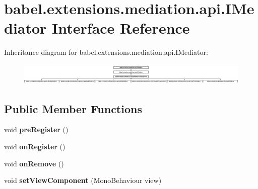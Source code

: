 \hypertarget{interfacebabel_1_1extensions_1_1mediation_1_1api_1_1_i_mediator}{\section{babel.\-extensions.\-mediation.\-api.\-I\-Mediator Interface Reference}
\label{interfacebabel_1_1extensions_1_1mediation_1_1api_1_1_i_mediator}
}
Inheritance diagram for babel.\-extensions.\-mediation.\-api.\-I\-Mediator\-:\begin{figure}[H]
\begin{center}
\leavevmode
\includegraphics[height=1.051643cm]{interfacebabel_1_1extensions_1_1mediation_1_1api_1_1_i_mediator}
\end{center}
\end{figure}
\subsection*{Public Member Functions}
\begin{DoxyCompactItemize}
\item 
\hypertarget{interfacebabel_1_1extensions_1_1mediation_1_1api_1_1_i_mediator_a7378512f73676b440c38921fb16c12e1}{void {\bfseries pre\-Register} ()}\label{interfacebabel_1_1extensions_1_1mediation_1_1api_1_1_i_mediator_a7378512f73676b440c38921fb16c12e1}

\item 
\hypertarget{interfacebabel_1_1extensions_1_1mediation_1_1api_1_1_i_mediator_aa621d634cb11563a449b0196c7b78317}{void {\bfseries on\-Register} ()}\label{interfacebabel_1_1extensions_1_1mediation_1_1api_1_1_i_mediator_aa621d634cb11563a449b0196c7b78317}

\item 
\hypertarget{interfacebabel_1_1extensions_1_1mediation_1_1api_1_1_i_mediator_abca25600d76d3797cb6ec2bacdc001eb}{void {\bfseries on\-Remove} ()}\label{interfacebabel_1_1extensions_1_1mediation_1_1api_1_1_i_mediator_abca25600d76d3797cb6ec2bacdc001eb}

\item 
\hypertarget{interfacebabel_1_1extensions_1_1mediation_1_1api_1_1_i_mediator_a806a9d50f2c849357afda6e3a65856a4}{void {\bfseries set\-View\-Component} (Mono\-Behaviour view)}\label{interfacebabel_1_1extensions_1_1mediation_1_1api_1_1_i_mediator_a806a9d50f2c849357afda6e3a65856a4}

\end{DoxyCompactItemize}
